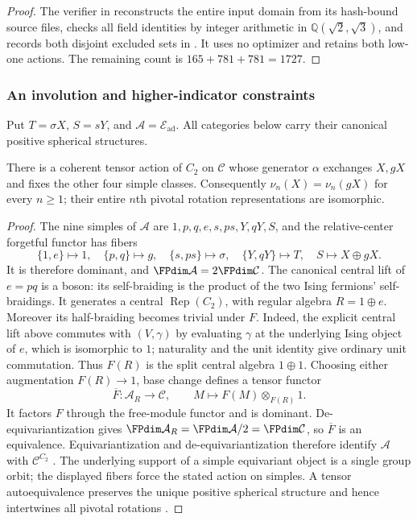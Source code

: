 \begin{proof}
The verifier  in
 reconstructs the entire input domain
from its hash-bound source files, checks all field identities by integer
arithmetic in $\mathbb Q(\sqrt2,\sqrt3)$, and records both disjoint
excluded sets in .
It uses no optimizer and retains both low-one actions. The remaining count is
$165+781+781=1727$.
\end{proof}

\subsubsection{An involution and higher-indicator constraints}

Put $T=\sigma X$, $S=sY$, and
$\mathcal A=\mathcal E_{\mathrm{ad}}$.
All categories below carry their canonical positive spherical structures.

\begin{proposition}\label{prop:1660-tensor-involution}
There is a coherent tensor action of $C_2$ on $\mathcal C$ whose generator
$\alpha$ exchanges $X,gX$ and fixes the other four simple classes.
Consequently $\nu_n(X)=\nu_n(gX)$ for every $n\geq1$; their entire
$n$th pivotal rotation representations are isomorphic.
\end{proposition}
\begin{proof}
The nine simples of $\mathcal A$ are $1,p,q,e,s,ps,Y,qY,S$, and the
relative-center forgetful functor has fibers
\[
 \{1,e\}\mapsto1,\quad\{p,q\}\mapsto g,\quad
 \{s,ps\}\mapsto\sigma,\quad\{Y,qY\}\mapsto T,\quad
 S\mapsto X\oplus gX.
\]
It is therefore dominant, and $\FPdim\mathcal A=2\FPdim\mathcal C$.
The canonical central lift of $e=pq$ is a boson: its self-braiding is
the product of the two Ising fermions' self-braidings. It generates a
central $\operatorname{Rep}(C_2)$, with regular algebra $R=1\oplus e$.
Moreover its half-braiding becomes trivial under $F$. Indeed, the
explicit central lift above commutes with $(V,\gamma)$ by evaluating
$\gamma$ at the underlying Ising object of $e$, which is isomorphic
to $1$; naturality and the unit identity give ordinary unit commutation.
Thus $F(R)$ is the split central algebra $1\oplus1$. Choosing either
augmentation $F(R)\to1$, base change defines a tensor functor
\[
 \overline F:\mathcal A_R\longrightarrow\mathcal C,
 \qquad M\longmapsto F(M)\otimes_{F(R)}1.
\]
It factors $F$ through the free-module functor and is dominant.
De-equivariantization gives
$\FPdim\mathcal A_R=\FPdim\mathcal A/2=\FPdim\mathcal C$,
so $\overline F$ is an equivalence. Equivariantization and
de-equivariantization therefore identify $\mathcal A$ with
$\mathcal C^{C_2}$ \cite[Section~4.2, especially Theorem~4.18 and
Proposition~4.26]{DGNO}. The underlying support of a simple equivariant
object is a single group orbit; the displayed fibers force the stated
action on simples. A tensor autoequivalence preserves the unique positive
spherical structure and hence intertwines all pivotal rotations
\cite{NSpiv}.
\end{proof}

